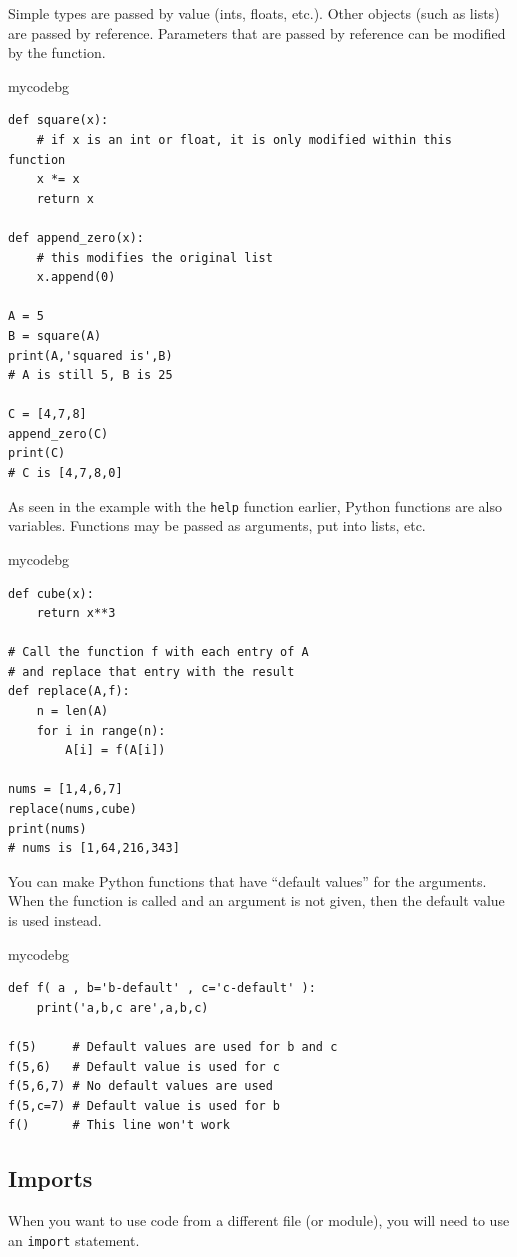 Simple types are passed by value (ints, floats, etc.).
Other objects (such as lists) are passed by reference.
Parameters that are passed by reference can be modified by the function.
\begin{tsession}{mycodebg}
\begin{verbatim}
def square(x):
    # if x is an int or float, it is only modified within this function
    x *= x
    return x

def append_zero(x):
    # this modifies the original list
    x.append(0)

A = 5
B = square(A)
print(A,'squared is',B)
# A is still 5, B is 25

C = [4,7,8]
append_zero(C)
print(C)
# C is [4,7,8,0]
\end{verbatim}
\end{tsession}
As seen in the example with the \texttt{help} function earlier,
Python functions are also variables.
Functions may be passed as arguments, put into lists, etc.
\begin{tsession}{mycodebg}
\begin{verbatim}
def cube(x):
    return x**3

# Call the function f with each entry of A
# and replace that entry with the result
def replace(A,f):
    n = len(A)
    for i in range(n):
        A[i] = f(A[i])

nums = [1,4,6,7]
replace(nums,cube)
print(nums)
# nums is [1,64,216,343]
\end{verbatim}
\end{tsession}
You can make Python functions that have ``default values'' for the arguments.
When the function is called and an argument is not given, then the default value is used instead.
\begin{tsession}{mycodebg}
\begin{verbatim}
def f( a , b='b-default' , c='c-default' ):
    print('a,b,c are',a,b,c)

f(5)     # Default values are used for b and c
f(5,6)   # Default value is used for c
f(5,6,7) # No default values are used
f(5,c=7) # Default value is used for b
f()      # This line won't work
\end{verbatim}
\end{tsession}
\subsection{Imports}
When you want to use code from a different file (or module),
you will need to use an \texttt{import} statement.


